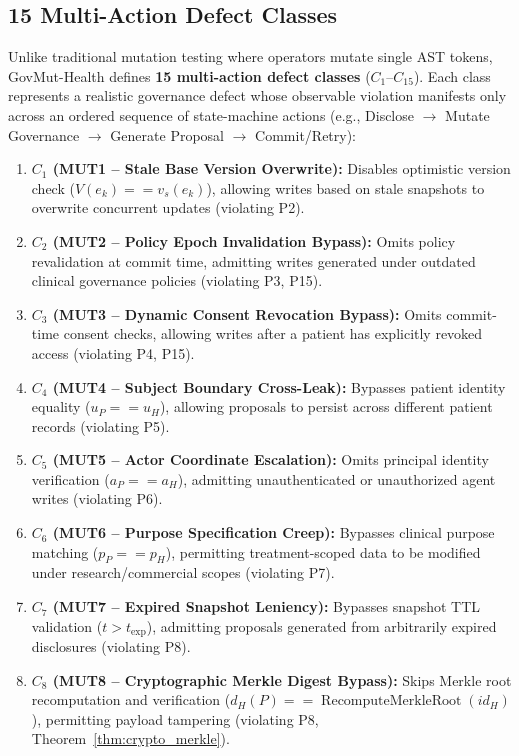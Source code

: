 \documentclass[runningheads]{llncs}
\begin{document}
\subsection{15 Multi-Action Defect Classes}
Unlike traditional mutation testing where operators mutate single AST tokens, GovMut-Health defines \textbf{15 multi-action defect classes} ($C_1$--$C_{15}$). Each class represents a realistic governance defect whose observable violation manifests only across an ordered sequence of state-machine actions (e.g., Disclose $\to$ Mutate Governance $\to$ Generate Proposal $\to$ Commit/Retry):

\begin{enumerate}
    \item \textbf{$C_1$ (MUT1 -- Stale Base Version Overwrite):} Disables optimistic version check ($V(e_k) == v_s(e_k)$), allowing writes based on stale snapshots to overwrite concurrent updates (violating P2).
    \item \textbf{$C_2$ (MUT2 -- Policy Epoch Invalidation Bypass):} Omits policy revalidation at commit time, admitting writes generated under outdated clinical governance policies (violating P3, P15).
    \item \textbf{$C_3$ (MUT3 -- Dynamic Consent Revocation Bypass):} Omits commit-time consent checks, allowing writes after a patient has explicitly revoked access (violating P4, P15).
    \item \textbf{$C_4$ (MUT4 -- Subject Boundary Cross-Leak):} Bypasses patient identity equality ($u_P == u_H$), allowing proposals to persist across different patient records (violating P5).
    \item \textbf{$C_5$ (MUT5 -- Actor Coordinate Escalation):} Omits principal identity verification ($a_P == a_H$), admitting unauthenticated or unauthorized agent writes (violating P6).
    \item \textbf{$C_6$ (MUT6 -- Purpose Specification Creep):} Bypasses clinical purpose matching ($p_P == p_H$), permitting treatment-scoped data to be modified under research/commercial scopes (violating P7).
    \item \textbf{$C_7$ (MUT7 -- Expired Snapshot Leniency):} Bypasses snapshot TTL validation ($t > t_{\text{exp}}$), admitting proposals generated from arbitrarily expired disclosures (violating P8).
    \item \textbf{$C_8$ (MUT8 -- Cryptographic Merkle Digest Bypass):} Skips Merkle root recomputation and verification ($d_H(P) == \operatorname{RecomputeMerkleRoot}(id_H)$), permitting payload tampering (violating P8, Theorem~\ref{thm:crypto_merkle}).

\end{enumerate}
\end{document}
